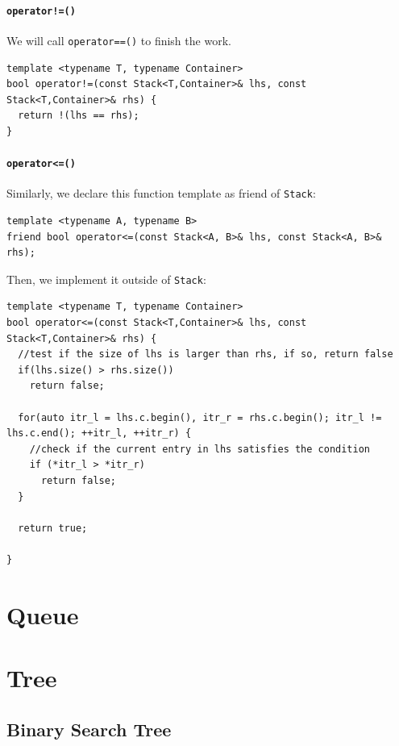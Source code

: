 \documentclass[11pt]{book}
\begin{document}
\subsubsection{\texttt{operator!=()}}
\label{sec:orgb289c37}
We will call \texttt{operator==()} to finish the work.
\begin{verbatim}
template <typename T, typename Container>
bool operator!=(const Stack<T,Container>& lhs, const Stack<T,Container>& rhs) {
  return !(lhs == rhs);
}
\end{verbatim}
\subsubsection{\texttt{operator<=()}}
\label{sec:orgc934748}
Similarly, we declare this function template as friend of \texttt{Stack}:
\begin{verbatim}
template <typename A, typename B>
friend bool operator<=(const Stack<A, B>& lhs, const Stack<A, B>& rhs);
\end{verbatim}

Then, we implement it outside of \texttt{Stack}:
\begin{verbatim}
template <typename T, typename Container>
bool operator<=(const Stack<T,Container>& lhs, const Stack<T,Container>& rhs) {
  //test if the size of lhs is larger than rhs, if so, return false
  if(lhs.size() > rhs.size())
    return false;

  for(auto itr_l = lhs.c.begin(), itr_r = rhs.c.begin(); itr_l != lhs.c.end(); ++itr_l, ++itr_r) {
    //check if the current entry in lhs satisfies the condition
    if (*itr_l > *itr_r)
      return false;
  }

  return true;

}
\end{verbatim}

\chapter{Queue}
\label{sec:org9e9b9da}
\chapter{Tree}
\label{sec:org37102a5}
\section{Binary Search Tree}
\label{sec:orgd6c81b1}
\end{document}
